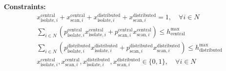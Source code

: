\documentclass{article}
\begin{document}
\textbf{Constraints:}
\begin{align}
    & x^{\text{central}}_{\text{isolate},i} + x^{\text{central}}_{\text{scan},i} + x^{\text{distributed}}_{\text{isolate},i} + x^{\text{distributed}}_{\text{scan},i} = 1, \quad \forall i \in N \\
    & \sum_{i \in N} \left(p^{\text{central}}_{\text{isolate},i} x^{\text{central}}_{\text{isolate},i} + p^{\text{central}}_{\text{scan},i} x^{\text{central}}_{\text{scan},i}\right) \leq h^{\text{max}}_{\text{central}} \\
    & \sum_{i \in N} \left(p^{\text{distributed}}_{\text{isolate},i} x^{\text{distributed}}_{\text{isolate},i} + p^{\text{distributed}}_{\text{scan},i} x^{\text{distributed}}_{\text{scan},i}\right) \leq h^{\text{max}}_{\text{distributed}} \\
    & x^{\text{central}}_{\text{isolate},i}, x^{\text{central}}_{\text{scan},i}, x^{\text{distributed}}_{\text{isolate},i}, x^{\text{distributed}}_{\text{scan},i} \in \{0, 1\}, \quad \forall i \in N
\end{align}
\end{document}
